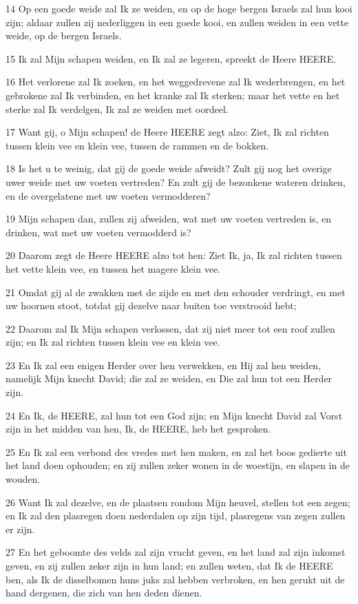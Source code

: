 \par 14 Op een goede weide zal Ik ze weiden, en op de hoge bergen Israels zal hun kooi zijn; aldaar zullen zij nederliggen in een goede kooi, en zullen weiden in een vette weide, op de bergen Israels.
\par 15 Ik zal Mijn schapen weiden, en Ik zal ze legeren, spreekt de Heere HEERE.
\par 16 Het verlorene zal Ik zoeken, en het weggedrevene zal Ik wederbrengen, en het gebrokene zal Ik verbinden, en het kranke zal Ik sterken; maar het vette en het sterke zal Ik verdelgen, Ik zal ze weiden met oordeel.
\par 17 Want gij, o Mijn schapen! de Heere HEERE zegt alzo: Ziet, Ik zal richten tussen klein vee en klein vee, tussen de rammen en de bokken.
\par 18 Is het u te weinig, dat gij de goede weide afweidt? Zult gij nog het overige uwer weide met uw voeten vertreden? En zult gij de bezonkene wateren drinken, en de overgelatene met uw voeten vermodderen?
\par 19 Mijn schapen dan, zullen zij afweiden, wat met uw voeten vertreden is, en drinken, wat met uw voeten vermodderd is?
\par 20 Daarom zegt de Heere HEERE alzo tot hen: Ziet Ik, ja, Ik zal richten tussen het vette klein vee, en tussen het magere klein vee.
\par 21 Omdat gij al de zwakken met de zijde en met den schouder verdringt, en met uw hoornen stoot, totdat gij dezelve naar buiten toe verstrooid hebt;
\par 22 Daarom zal Ik Mijn schapen verlossen, dat zij niet meer tot een roof zullen zijn; en Ik zal richten tussen klein vee en klein vee.
\par 23 En Ik zal een enigen Herder over hen verwekken, en Hij zal hen weiden, namelijk Mijn knecht David; die zal ze weiden, en Die zal hun tot een Herder zijn.
\par 24 En Ik, de HEERE, zal hun tot een God zijn; en Mijn knecht David zal Vorst zijn in het midden van hen, Ik, de HEERE, heb het gesproken.
\par 25 En Ik zal een verbond des vredes met hen maken, en zal het boos gedierte uit het land doen ophouden; en zij zullen zeker wonen in de woestijn, en slapen in de wouden.
\par 26 Want Ik zal dezelve, en de plaatsen rondom Mijn heuvel, stellen tot een zegen; en Ik zal den plasregen doen nederdalen op zijn tijd, plasregens van zegen zullen er zijn.
\par 27 En het geboomte des velds zal zijn vrucht geven, en het land zal zijn inkomst geven, en zij zullen zeker zijn in hun land; en zullen weten, dat Ik de HEERE ben, als Ik de disselbomen huns juks zal hebben verbroken, en hen gerukt uit de hand dergenen, die zich van hen deden dienen.
